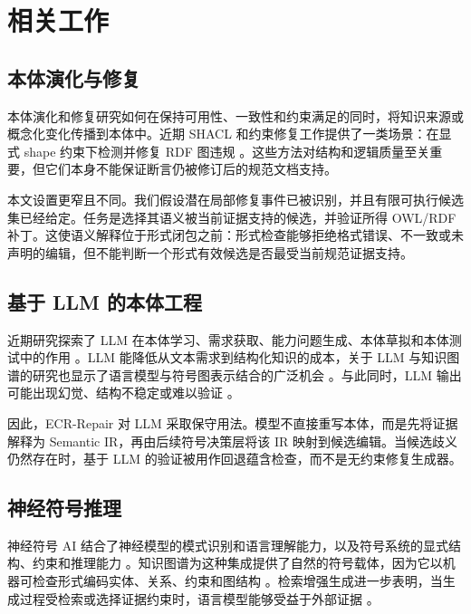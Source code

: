 \documentclass[conference]{IEEEtran}
\begin{document}
\section{相关工作}

\subsection{本体演化与修复}

本体演化和修复研究如何在保持可用性、一致性和约束满足的同时，将知识来源或概念化变化传播到本体中。近期 SHACL 和约束修复工作提供了一类场景：在显式 shape 约束下检测并修复 RDF 图违规 \cite{ahmetaj2022shacl,ahmetaj2025shacl}。这些方法对结构和逻辑质量至关重要，但它们本身不能保证断言仍被修订后的规范文档支持。

本文设置更窄且不同。我们假设潜在局部修复事件已被识别，并且有限可执行候选集已经给定。任务是选择其语义被当前证据支持的候选，并验证所得 OWL/RDF 补丁。这使语义解释位于形式闭包之前：形式检查能够拒绝格式错误、不一致或未声明的编辑，但不能判断一个形式有效候选是否最受当前规范证据支持。

\subsection{基于 LLM 的本体工程}

近期研究探索了 LLM 在本体学习、需求获取、能力问题生成、本体草拟和本体测试中的作用 \cite{giglou2024llms4ol,lippolis2025ontologygeneration,zhang2025ontochat,fathallah2025neongpt}。LLM 能降低从文本需求到结构化知识的成本，关于 LLM 与知识图谱的研究也显示了语言模型与符号图表示结合的广泛机会 \cite{pan2024llmkg}。与此同时，LLM 输出可能出现幻觉、结构不稳定或难以验证 \cite{ji2023hallucination}。

因此，ECR-Repair 对 LLM 采取保守用法。模型不直接重写本体，而是先将证据解释为 Semantic IR，再由后续符号决策层将该 IR 映射到候选编辑。当候选歧义仍然存在时，基于 LLM 的验证被用作回退蕴含检查，而不是无约束修复生成器。

\subsection{神经符号推理}

神经符号 AI 结合了神经模型的模式识别和语言理解能力，以及符号系统的显式结构、约束和推理能力 \cite{yu2023neurosymbolic}。知识图谱为这种集成提供了自然的符号载体，因为它以机器可检查形式编码实体、关系、约束和图结构 \cite{hogan2021knowledgegraphs}。检索增强生成进一步表明，当生成过程受检索或选择证据约束时，语言模型能够受益于外部证据 \cite{gao2024rag,asai2023selfrag}。
\end{document}
